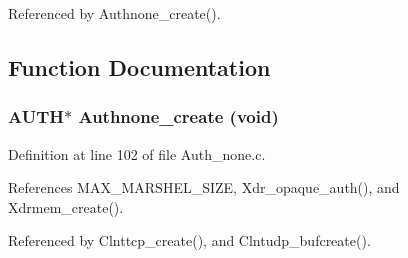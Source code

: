Referenced by Authnone\_\-create().

\subsection{Function Documentation}
\subsubsection{\setlength{\rightskip}{0pt plus 5cm}AUTH$\ast$ Authnone\_\-create (void)}\label{Auth__none_8c_a10}




Definition at line 102 of file Auth\_\-none.c.

References MAX\_\-MARSHEL\_\-SIZE, Xdr\_\-opaque\_\-auth(), and Xdrmem\_\-create().

Referenced by Clnttcp\_\-create(), and Clntudp\_\-bufcreate().